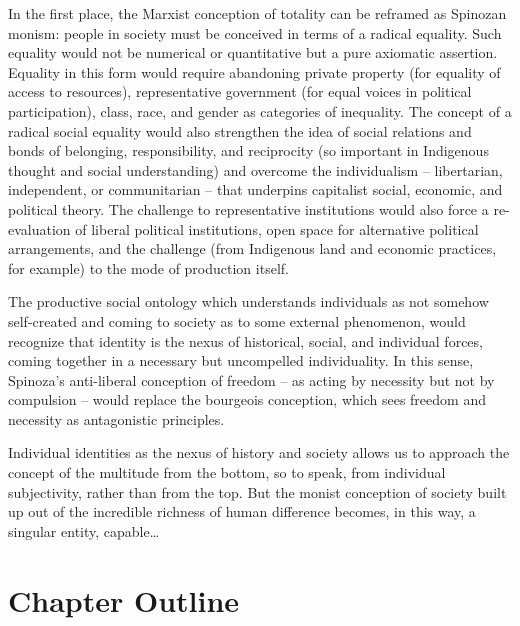 \documentclass[12pt,oneside]{memoir}
\begin{document}
	In the first place, the Marxist conception of totality can be reframed as Spinozan monism: people in society must be conceived in terms of a radical equality. Such equality would not be numerical or quantitative but a pure axiomatic assertion. Equality in this form would require abandoning private property (for equality of access to resources), representative government (for equal voices in political participation), class, race, and gender as categories of inequality. The concept of a radical social equality would also strengthen the idea of social relations and bonds of belonging, responsibility, and reciprocity (so important in Indigenous thought and social understanding) and overcome the individualism -- libertarian, independent, or communitarian -- that underpins capitalist social, economic, and political theory. The challenge to representative institutions would also force a re-evaluation of liberal political institutions, open space for alternative political arrangements, and the challenge (from Indigenous land and economic practices, for example) to the mode of production itself.
	
	The productive social ontology which understands individuals as not somehow self-created and coming to society as to some external phenomenon, would recognize that identity is the nexus of historical, social, and individual forces, coming together in a necessary but uncompelled individuality. In this sense, Spinoza's anti-liberal conception of freedom -- as acting by necessity but not by compulsion -- would replace the bourgeois conception, which sees freedom and necessity as antagonistic principles.
	
	Individual identities as the nexus of history and society allows us to approach the concept of the multitude from the bottom, so to speak, from individual subjectivity, rather than from the top. But the monist conception of society built up out of the incredible richness of human difference becomes, in this way, a singular entity, capable{\ldots}

\section*{Chapter Outline}
\end{document}

